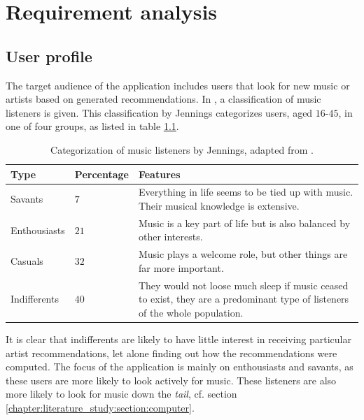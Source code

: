 \chapter{Requirement analysis}\label{chapter:requirements}

\section{User profile}

The target audience of the application includes users that look for new music or artists based on generated recommendations. In \cite{song:2012}, a classification of music listeners is given. This classification by Jennings categorizes users, aged $16$-$45$, in one of four groups, as listed in table \ref{table:jennings:listeners}.


\begin{table}[h]
\caption{Categorization of music listeners by Jennings, adapted from \cite{song:2012}.}
\begin{center}
	\begin{tabular}{ l | l | p{250px} } %
		\hline
		\textbf{Type}			&		\textbf{Percentage}			&			\textbf{Features} \\
		\hline
		Savants 			& $7$		& Everything in life seems to be tied up with music. Their musical knowledge is extensive. \\
		Enthousiasts 	& $21$	& Music is a key part of life but is also balanced by other interests. \\
		Casuals				& $32$	& Music plays a welcome role, but other things are far more important. \\
		Indifferents	& $40$	& They would not loose much sleep if music ceased to exist, they are a predominant type of listeners of the whole population. \\
		\hline
	\end{tabular}
\end{center}
\label{table:jennings:listeners}
\end{table}

It is clear that indifferents are likely to have little interest in receiving particular artist recommendations, let alone finding out how the recommendations were computed. The focus of the application is mainly on enthousiasts and savants, as these users are more likely to look actively for music. These listeners are also more likely to look for music down the \emph{tail}\cite{song:2012}, cf. section \ref{chapter:literature_study:section:computer}.

